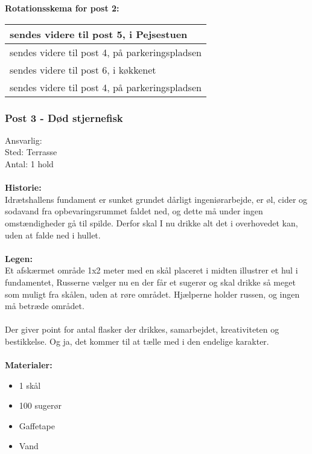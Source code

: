 \textbf{Rotationsskema for post 2:}\\
\begin{tabular}{ | l | }
\hline
	 \Hippier sendes videre til post 5, \KABS i Pejsestuen \\ \hline
	 \Poppere sendes videre til post 4, \Johnny på parkeringspladsen \\ \hline
	 \Norder sendes videre til post 6, \Hyttebombz{} i køkkenet \\ \hline
	 \Fransk sendes videre til post 4, \Johnny på parkeringspladsen \\ \hline
\end{tabular}



\subsubsection{Post 3 - Død stjernefisk}
Ansvarlig: \Ora \\
Sted: Terrasse\\
Antal: 1 hold\\\\
\textbf{Historie:}\\
Idrætshallens fundament er sunket grundet dårligt ingeniørarbejde, er øl, cider og sodavand fra opbevaringsrummet faldet ned, og dette må under ingen omstændigheder gå til spilde. Derfor skal I nu drikke alt det i overhovedet kan, uden at falde ned i hullet. \\\\
\textbf{Legen:}\\
Et afskærmet område 1x2 meter med en skål placeret i midten illustrer et hul i fundamentet,
Russerne vælger nu en der får et sugerør og skal drikke så meget som muligt fra skålen, uden
at røre området. Hjælperne holder russen, og ingen må betræde området. \\\\
Der giver point for antal flasker der drikkes, samarbejdet, kreativiteten og bestikkelse. 
Og ja, det kommer til at tælle med i den endelige karakter.\\\\
\textbf{Materialer:}
\begin{multicols}{2}
\begin{itemize}
\item 1 skål
\item 100 sugerør
\item Gaffetape
\item Vand
\end{itemize}
\end{multicols}


